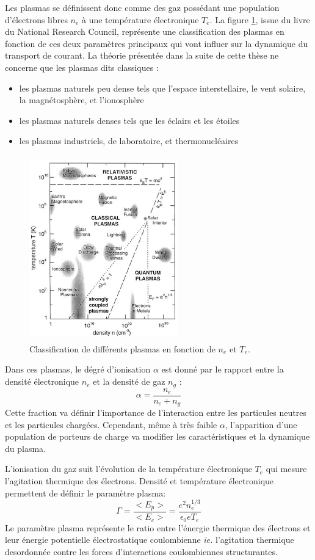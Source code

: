 Les plasmas se définissent donc comme des gaz possédant une population
d'électrons libres $n_e$ à une température électronique $T_e$.
La figure \ref{zoologie}, issue du livre du National Research
Council\cite{national1995Plasma}, représente une classification des plasmas en
fonction de ces deux paramètres principaux qui vont influer sur la dynamique du
transport de courant.
La théorie présentée dans la suite de cette thèse ne concerne que les plasmas
dits classiques :
			\begin{itemize}
			  \item les plasmas naturels peu dense tels que l'espace interstellaire,
			  le vent solaire, la magnétosphère, et l'ionosphère
			  \item les plasmas naturels denses tels que les éclairs et les étoiles
			  \item les plasmas industriels, de laboratoire, et thermonucléaires
			\end{itemize}
			\begin{figure}[htbp]
				\centering
				\includegraphics[height=80mm,width=64mm]{figures/zoologie.png}{\caption{Classification
				de différents plasmas en fonction de $n_e$ et $T_e$.}\label{zoologie}}
			\end{figure}
			
			Dans ces plasmas, le dégré d'ionisation $\alpha$ est donné par le rapport
			entre la densité électronique $n_e$ et la densité de gaz $n_g$ :
				$$\alpha=\frac{n_e}{n_e+n_g}$$
			Cette fraction va définir l'importance de l'interaction entre les particules 
			neutres et les particules chargées. Cependant, même à très faible $\alpha$,
			l'apparition d'une population de porteurs de charge va modifier les caractéristiques et la
			dynamique du plasma. 
			
			L'ionisation du gaz suit l'évolution de la température électronique $T_e$ qui
			mesure l'agitation thermique des électrons. Densité et température
			électronique permettent de définir le paramètre plasma:
				$$\Gamma=\frac{<E_p>}{<E_c>}=\frac{e^2n_e^{1/3}}{\epsilon_0 eT_e}$$
			Le paramètre plasma représente le ratio entre l'énergie thermique des
			électrons et leur énergie potentielle électrostatique coulombienne \emph{ie.}
			l'agitation thermique desordonnée contre les forces d'interactions
			coulombiennes structurantes. 
			
